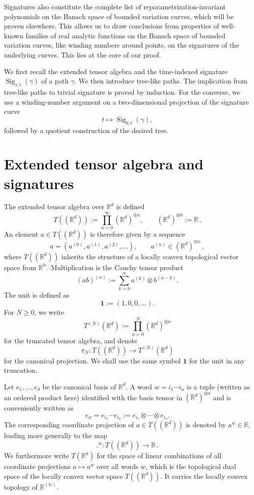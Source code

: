 \documentclass[11pt]{article}
\theoremstyle{definition}
\newcommand{\R}{\mathbb{R}}
\newcommand{\Sig}{\operatorname{Sig}}
\newcommand{\id}{\mathbf{1}}
\newcommand{\proj}[1]{\pi_{#1}}
\begin{document}
Signatures also constitute the complete list of reparametrization-invariant polynomials on the Banach space of bounded variation curves, which will be proven elsewhere. This allows us to draw conclusions from properties of well-known families of real analytic functions on the Banach space of bounded variation curves, like winding numbers around points, on the signatures of the underlying curves. This lies at the core of our proof.

We first recall the extended tensor algebra and the time-indexed signature \(\Sig_{s,t}(\gamma)\) of a path $\gamma$. We then introduce tree-like paths. The implication from tree-like paths to trivial signature is proved by induction. 
For the converse, we use a winding-number argument on a two-dimensional projection of the signature curve
\[
  t\longmapsto \Sig_{0,t}(\gamma),
\]
followed by a quotient construction of the desired tree.

\section{Extended tensor algebra and signatures}\label{sec:signatures}

The extended tensor algebra over $\R^d$ is defined
\[
  T((\R^d)):=\prod_{n=0}^{\infty} (\R^d)^{\otimes n},
  \qquad (\R^d)^{\otimes 0}:=\R \, .
\]
An element $ a\in T((\R^d)) $ is therefore given by a sequence
\[
  a=(a^{(0)},a^{(1)},a^{(2)},\ldots),
  \qquad a^{(n)}\in (\R^d)^{\otimes n} \, ,
\]
where $T((\mathbb{R}^d))$ inherits the structure of a locally convex topological vector space from $\mathbb{R}^\mathbb{N}$.
Multiplication is the Cauchy tensor product
\[
  (ab)^{(n)}:=\sum_{k=0}^n a^{(k)}\otimes b^{(n-k)}.
\]
The unit is defined as
\[
\id  :=(1,0,0,\ldots).
\]
For $N\geq 0$, we write
\[
  T^{(N)}(\R^d):=\prod_{n=0}^N (\R^d)^{\otimes n}
\]
for the truncated tensor algebra, and denote
\[
  \proj{N}:T((\R^d))\to T^{(N)}(\R^d)
\]
for the canonical projection. We shall use the same symbol $\id$ for the unit in any truncation.

Let $e_1,\ldots,e_d$ be the canonical basis of $\R^d$. A word $w=i_1\cdots i_n$ is a tuple (written as an ordered product here) identified with the basis tensor in $(\mathbb{R}^d)^{\otimes n}$ and is conveniently written as
\[
e_w = e_{i_1}\cdots e_{i_n}  :=e_{i_1}\otimes\cdots\otimes e_{i_n}.
\]
The corresponding coordinate projection of $a\in T((\R^d))$ is denoted by $a^w \in \mathbb{R}$, leading more generally to the map  
$$
.^w : T((\mathbb{R}^d)) \to \mathbb{R} \, .
$$
We furthermore write  $ T(\mathbb{R}^d) $ for the space of linear combinations of all coordinate projections $ a \mapsto a^w $ over all words $ w $, which is the topological dual space of the locally convex vector space $T((\mathbb{R}^d))$. It carries the locally convex topology of $\mathbb{R}^{(\mathbb{N})}$.
\end{document}
